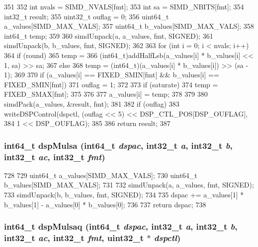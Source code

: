 \begin{DoxyCode}
351 {
352     int nvals = SIMD_NVALS[fmt];
353     int sa = SIMD_NBITS[fmt];
354     int32_t result;
355     uint32_t ouflag = 0;
356     uint64_t a_values[SIMD_MAX_VALS];
357     uint64_t b_values[SIMD_MAX_VALS];
358     int64_t temp;
359 
360     simdUnpack(a, a_values, fmt, SIGNED);
361     simdUnpack(b, b_values, fmt, SIGNED);
362 
363     for (int i = 0; i < nvals; i++) {
364         if (round)
365             temp =
366                 (int64_t)addHalfLsb(a_values[i] * b_values[i] << 1, sa) >> sa;
367         else
368             temp = (int64_t)(a_values[i] * b_values[i]) >> (sa - 1);
369 
370         if (a_values[i] == FIXED_SMIN[fmt] && b_values[i] == FIXED_SMIN[fmt]) {
371             ouflag = 1;
372 
373             if (saturate)
374                 temp = FIXED_SMAX[fmt];
375         }
376 
377         a_values[i] = temp;
378     }
379 
380     simdPack(a_values, &result, fmt);
381 
382     if (ouflag)
383         writeDSPControl(dspctl, (ouflag << 5) << DSP_CTL_POS[DSP_OUFLAG],
384                         1 << DSP_OUFLAG);
385 
386     return result;
387 }
\end{DoxyCode}
\hypertarget{namespaceMipsISA_a5ee886f543d611b1ed90edbab6ed65ea}{
\subsubsection[{dspMulsa}]{\setlength{\rightskip}{0pt plus 5cm}int64\_\-t dspMulsa (int64\_\-t {\em dspac}, \/  int32\_\-t {\em a}, \/  int32\_\-t {\em b}, \/  int32\_\-t {\em ac}, \/  int32\_\-t {\em fmt})}}
\label{namespaceMipsISA_a5ee886f543d611b1ed90edbab6ed65ea}



\begin{DoxyCode}
728 {
729     uint64_t a_values[SIMD_MAX_VALS];
730     uint64_t b_values[SIMD_MAX_VALS];
731 
732     simdUnpack(a, a_values, fmt, SIGNED);
733     simdUnpack(b, b_values, fmt, SIGNED);
734 
735     dspac += a_values[1] * b_values[1] - a_values[0] * b_values[0];
736 
737     return dspac;
738 }
\end{DoxyCode}
\hypertarget{namespaceMipsISA_a4cc04259ad0dee2a8f51aeafd6f86e92}{
\subsubsection[{dspMulsaq}]{\setlength{\rightskip}{0pt plus 5cm}int64\_\-t dspMulsaq (int64\_\-t {\em dspac}, \/  int32\_\-t {\em a}, \/  int32\_\-t {\em b}, \/  int32\_\-t {\em ac}, \/  int32\_\-t {\em fmt}, \/  {\bf uint32\_\-t} $\ast$ {\em dspctl})}}
\label{namespaceMipsISA_a4cc04259ad0dee2a8f51aeafd6f86e92}



